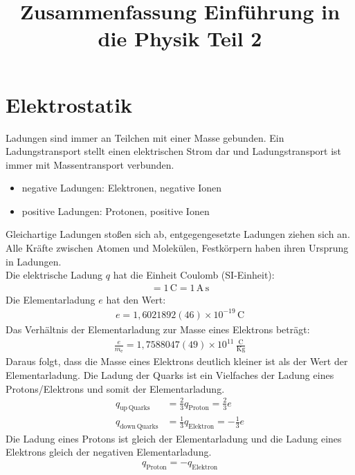 \documentclass{scrartcl}
\title{Zusammenfassung Einführung in die Physik Teil 2}
\begin{document}
\maketitle
\tableofcontents
\newpage



\section{Elektrostatik}
Ladungen sind immer an Teilchen mit einer Masse gebunden. Ein Ladungstransport stellt einen elektrischen Strom dar und Ladungstransport
ist immer mit Massentransport verbunden.
\begin{itemize}
\item negative Ladungen: Elektronen, negative Ionen 
\item positive Ladungen: Protonen, positive Ionen
\end{itemize}
Gleichartige Ladungen stoßen sich ab, entgegengesetzte Ladungen ziehen sich an. Alle Kräfte zwischen Atomen und Molekülen,
Festkörpern haben ihren Ursprung in Ladungen.\\

Die elektrische Ladung $q$ hat die Einheit Coulomb (SI-Einheit):
\begin{align}
    [q]=1\,\mathrm{C}=1\,\mathrm{A\,s}
\end{align}
Die Elementarladung $e$ hat den Wert:
\begin{align}
    e=1,6021892(46)\times 10^{-19}\,\mathrm{C}
\end{align}
Das Verhältnis der Elementarladung zur Masse eines Elektrons beträgt:
\begin{align}
    \frac{e}{m_\mathrm{e}}=1,7588047(49)\times 10^{11}\,\frac{\mathrm{C}}{\mathrm{Kg}}
\end{align}
Daraus folgt, dass die Masse eines Elektrons deutlich kleiner ist als der Wert der Elementarladung.
Die Ladung der Quarks ist ein Vielfaches der Ladung eines Protons/Elektrons und somit der Elementarladung.
\begin{align}
    q_\mathrm{up\, Quarks}&=\frac{2}{3}q_\mathrm{Proton}=\frac{2}{3}e\\
    q_\mathrm{down\, Quarks}&=\frac{1}{3}q_\mathrm{Elektron}=-\frac{1}{3}e
\end{align}
Die Ladung eines Protons ist gleich der Elementarladung und die Ladung eines Elektrons gleich der negativen Elementarladung.
\begin{align}
    q_\mathrm{Proton}=-q_\mathrm{Elektron}
\end{align}
\end{document}
